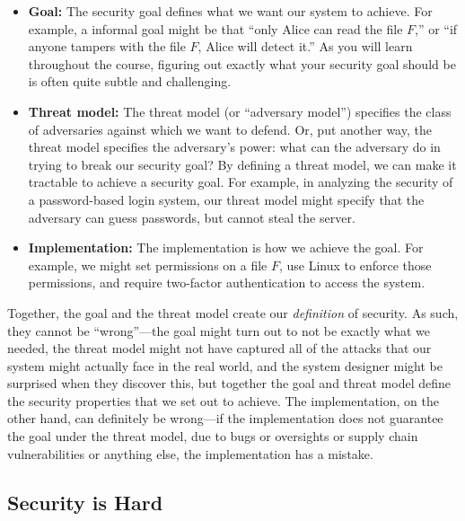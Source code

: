 \begin{itemize}
  \item \textbf{Goal:} 
    The security goal defines what we want our system to achieve.
    For example, a informal goal might be that ``only Alice can read the file $F$,''
    or ``if anyone tampers with the file $F$, Alice will detect it.''
    As you will learn throughout the course, figuring out exactly what your
    security goal should be is often quite subtle and challenging.

  \item \textbf{Threat model:} 
    The threat model (or ``adversary model'') specifies the class of 
    adversaries against which we want to defend.
    Or, put another way, the threat model specifies the adversary's power:
    what can the adversary do in trying to break our security goal?
    By defining a threat model, we can make it
    tractable to achieve a security goal. 
    For example, in analyzing the security of a password-based login system,
    our threat model might specify that 
    the adversary can guess passwords, but cannot steal the server.
  \item \textbf{Implementation:}
    The implementation is how we achieve the goal.
    For example, we might set permissions on a file $F$, 
    use Linux to enforce those permissions, 
    and require two-factor authentication to access the system.
\end{itemize}

Together, the goal and the threat model create our
\textit{definition} of security.
As such, they
cannot be ``wrong''---the goal might turn out to
not be exactly what we needed, 
the threat model might not have captured all of
the attacks that our system might actually face
in the real world, and the system designer might
be surprised when they discover this,
but together the goal and threat model define 
the security properties that we set out to achieve.
The implementation, on the other hand, can definitely be wrong---if 
the implementation does not guarantee the goal under the threat model, due to bugs or oversights or supply chain vulnerabilities or anything else, the implementation has a mistake.

\subsection{Security is Hard}

